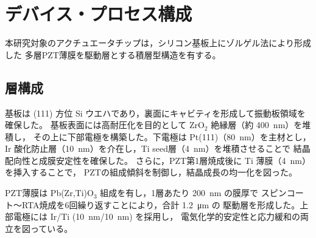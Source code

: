 \documentclass[conference]{IEEEtran}
\begin{document}
\section{デバイス・プロセス構成}
本研究対象のアクチュエータチップは，シリコン基板上にゾルゲル法により形成した
多層PZT薄膜を駆動層とする積層型構造を有する。

\subsection{層構成}
基板は (111) 方位 Si ウエハであり，裏面にキャビティを形成して振動板領域を確保した。
基板表面には高耐圧化を目的として ZrO$_2$ 絶縁層（約 \SI{400}{nm}）を堆積し，
その上に下部電極を構築した。下電極は Pt(111)（\SI{80}{nm}）を主材とし，
Ir 酸化防止層（\SI{10}{nm}）を介在し，Ti seed層（\SI{4}{nm}）を堆積させることで
結晶配向性と成膜安定性を確保した。
さらに，PZT第1層焼成後に Ti 薄膜（\SI{4}{nm}）を挿入することで，
PZTの組成傾斜を制御し，結晶成長の均一化を図った。

PZT薄膜は Pb(Zr,Ti)O$_3$ 組成を有し，1層あたり \SI{200}{nm} の膜厚で
スピンコート～RTA焼成を6回繰り返すことにより，合計 \SI{1.2}{\micro\metre} の
駆動層を形成した。上部電極には Ir/Ti (\SI{10}{nm}/\SI{10}{nm}) を採用し，
電気化学的安定性と応力緩和の両立を図っている。
\end{document}
